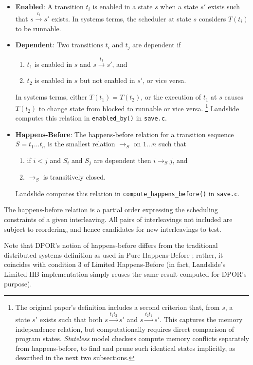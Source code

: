 \begin{itemize}
	\item {\bf Enabled}: A transition $t_i$ is enabled in a state $s$ when a state $s'$ exists such that $s \xrightarrow{t_i} s'$ exists.
		In systems terms, the scheduler at state $s$ considers $T(t_i)$ to be runnable.
	\item {\bf Dependent}: Two transitions $t_i$ and $t_j$ are dependent if
		\begin{enumerate}
			\item $t_1$ is enabled in $s$ and $s \xrightarrow{t_1} s'$, and
			\item $t_2$ is enabled in $s$ but not enabled in $s'$, or vice versa.
		\end{enumerate}
		In systems terms, either $T(t_1) = T(t_2)$,
		or the execution of $t_1$ at $s$ causes $T(t_2)$
		to change state from blocked to runnable or vice versa.
		\footnote{The original paper's definition includes a second criterion that, from $s$,
		a state $s'$ exists such that both $s \xrightarrow{t_1 t_2} s'$ and $s \xrightarrow{t_2 t_1} s'$.
		This captures the memory independence relation,
		but computationally requires direct comparison of program states.
		{\em Stateless} model checkers compute memory conflicts separately from happens-before,
		to find and prune such identical states implicitly,
		as described in the next two subsections.}
		Landslide computes this relation in {\tt enabled\_by()} in {\tt save.c}.
	\item {\bf Happens-Before}: The happens-before relation for a transition sequence $S = t_1 \dots t_n$
		is the smallest relation $\rightarrow_S$ on ${1 \dots n}$ such that
		\begin{enumerate}
			\item if $i < j$ and $S_i$ and $S_j$ are dependent then $i \rightarrow_S j$, and
			\item $\rightarrow_S$ is transitively closed.
		\end{enumerate}
		Landslide computes this relation in
		{\tt compute\_happens\_before()} in {\tt save.c}.
\end{itemize}
The happens-before relation is a partial order expressing the scheduling constraints of a given interleaving.
All pairs of interleavings not included are subject to reordering,
and hence candidates for new interleavings to test.

Note that DPOR's notion of happens-before differs from the traditional distributed systems definition \cite{lamport-clocks}
as used in Pure Happens-Before \sect{\ref{sec:background-hb}};
rather, it coincides with condition 3 of Limited Happens-Before %
(in fact, Landslide's Limited HB implementation simply reuses the same result computed for DPOR's purpose).

